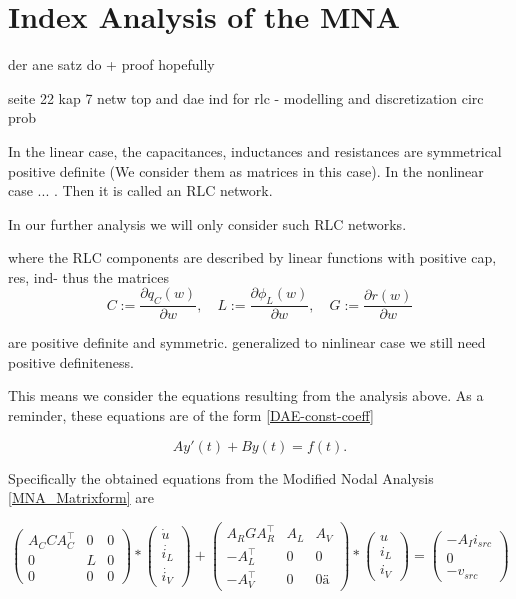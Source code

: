 \chapter{Index Analysis of the MNA}

der ane satz do + proof hopefully

seite 22 kap 7 netw top and dae ind for rlc - modelling and discretization circ prob

In the linear case, the capacitances, inductances and resistances are symmetrical positive definite (We consider them as matrices in this case). In the nonlinear case ... . Then it is called an RLC network.

In our further analysis we will only consider such RLC networks.

where the RLC components are described by linear functions with positive cap, res, ind- thus the matrices
\begin{displaymath}
	C:=\frac{\partial q_C(w)}{\partial w}, \quad L:=\frac{\partial \phi_L(w)}{\partial w}, \quad G:=\frac{\partial r(w)}{\partial w}
\end{displaymath}

are positive definite and symmetric.
generalized to ninlinear case we still need positive definiteness.


This means we consider the equations resulting from the analysis above. As a reminder, these equations are of the form \ref{DAE-const-coeff}

\begin{displaymath}
	A y'(t) + B y(t) = f(t).
\end{displaymath}

Specifically the obtained equations from the Modified Nodal Analysis \ref{MNA_Matrixform} are

\begin{displaymath}
	\begin{pmatrix}
		A_C C A_C^\top & 0 & 0 \\
		0 & L & 0 \\
		0 & 0 & 0
	\end{pmatrix}
	*
	\begin{pmatrix}
		\dot{u} \\
		\dot{i_L} \\
		\dot{i_V}
	\end{pmatrix}
	+
	\begin{pmatrix}
		A_R G A_R^\top & A_L & A_V \\
		-A_L^\top & 0 & 0 \\
		-A_V^\top & 0 & 0 ä
	\end{pmatrix}
	*
	\begin{pmatrix}
		u \\
		i_L \\
		i_V
	\end{pmatrix}
	=
	\begin{pmatrix}
		-A_I i_{src} \\
		0 \\
		-v_{src}
	\end{pmatrix}
\end{displaymath}

